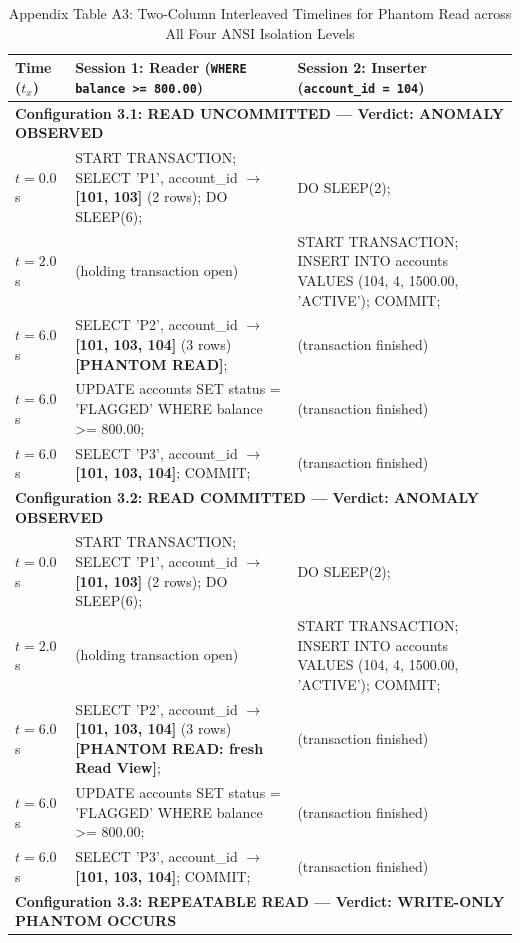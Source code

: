 \documentclass[sigconf, pbalance, nonacm]{acmart}
\begin{document}
\begin{table}[p]
\centering
\small
\caption{Appendix Table A3: Two-Column Interleaved Timelines for Phantom Read across All Four ANSI Isolation Levels}
\label{tab:app_phantom}
\begin{tabularx}{\textwidth}{p{1.8cm} X X}
\toprule
\textbf{Time ($t_x$)} & \textbf{Session 1: Reader (\texttt{WHERE balance >= 800.00})} & \textbf{Session 2: Inserter (\texttt{account\_id = 104})} \\
\midrule
\multicolumn{3}{l}{\textbf{Configuration 3.1: READ UNCOMMITTED --- Verdict: ANOMALY OBSERVED}} \\
$t = 0.0$s & START TRANSACTION; SELECT 'P1', account\_id $\rightarrow$ \textbf{[101, 103]} (2 rows); DO SLEEP(6); & DO SLEEP(2); \\
$t = 2.0$s & (holding transaction open) & START TRANSACTION; INSERT INTO accounts VALUES (104, 4, 1500.00, 'ACTIVE'); COMMIT; \\
$t = 6.0$s & SELECT 'P2', account\_id $\rightarrow$ \textbf{[101, 103, 104]} (3 rows) \textbf{[PHANTOM READ]}; & (transaction finished) \\
$t = 6.0$s & UPDATE accounts SET status = 'FLAGGED' WHERE balance >= 800.00; & (transaction finished) \\
$t = 6.0$s & SELECT 'P3', account\_id $\rightarrow$ \textbf{[101, 103, 104]}; COMMIT; & (transaction finished) \\
\midrule
\multicolumn{3}{l}{\textbf{Configuration 3.2: READ COMMITTED --- Verdict: ANOMALY OBSERVED}} \\
$t = 0.0$s & START TRANSACTION; SELECT 'P1', account\_id $\rightarrow$ \textbf{[101, 103]} (2 rows); DO SLEEP(6); & DO SLEEP(2); \\
$t = 2.0$s & (holding transaction open) & START TRANSACTION; INSERT INTO accounts VALUES (104, 4, 1500.00, 'ACTIVE'); COMMIT; \\
$t = 6.0$s & SELECT 'P2', account\_id $\rightarrow$ \textbf{[101, 103, 104]} (3 rows) \textbf{[PHANTOM READ: fresh Read View]}; & (transaction finished) \\
$t = 6.0$s & UPDATE accounts SET status = 'FLAGGED' WHERE balance >= 800.00; & (transaction finished) \\
$t = 6.0$s & SELECT 'P3', account\_id $\rightarrow$ \textbf{[101, 103, 104]}; COMMIT; & (transaction finished) \\
\midrule
\multicolumn{3}{l}{\textbf{Configuration 3.3: REPEATABLE READ --- Verdict: WRITE-ONLY PHANTOM OCCURS}} \\

\end{tabularx}
\end{table}
\end{document}
